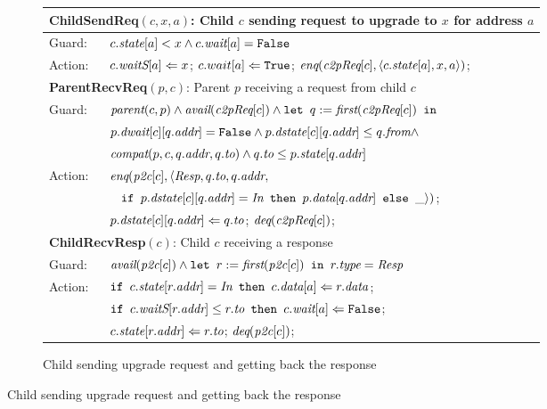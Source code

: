 \begin{figure}
\small
\centering
\begin{subfigure}{\textwidth}
\centering
\begin{tabular}{|ll|}
\hline
\multicolumn{2}{|l|}{\textbf{ChildSendReq}$(c, x, a)$: Child $c$ sending request to upgrade to $x$ for address $a$}\\
\hline
Guard: & $c.\textit{state}[a] < x \wedge c.\textit{wait}[a] = \texttt{False}$\\
\hline
Action: & $c.\textit{waitS}[a] \Leftarrow x$; $c.wait[a] \Leftarrow \texttt{True}$; $\textit{enq}(\textit{c2pReq}[c], \langle c.\textit{state}[a], x, a \rangle)$;\\
\hline
\hline
\multicolumn{2}{|l|}{\textbf{ParentRecvReq}$(p, c)$: Parent $p$ receiving a request from child $c$}\\
\hline
Guard: & 
$\textit{parent}(c,p) \wedge \textit{avail}(\textit{c2pReq}[c]) \wedge \texttt{let } q := \textit{first}(\textit{c2pReq}[c]) \texttt{ in }$\\
& $p.\textit{dwait}[c][q.\textit{addr}] = \texttt{False} \wedge p.\textit{dstate}[c][q.\textit{addr}] \le q.\textit{from} \wedge$\\
& $\textit{compat}(p, c, q.\textit{addr}, q.\textit{to}) \wedge q.\textit{to} \le p.\textit{state}[q.\textit{addr}]$\\
\hline
Action: & $\textit{enq}(\textit{p2c}[c], \langle \textit{Resp}, q.\textit{to}, q.\textit{addr}, $\\
& $\;\;\;%
\myif p.\dstate[c][q.\addr] = \In \mythen p.\data[q.\addr] \myelse \_\rangle)$;\\
& $p.\textit{dstate}[c][q.\textit{addr}] \Leftarrow q.\textit{to}$; $\textit{deq}(\textit{c2pReq}[c])$;\\
\hline
\hline
\multicolumn{2}{|l|}{\textbf{ChildRecvResp}$(c)$: Child $c$ receiving a response}\\
\hline
Guard: & 
$\textit{avail}(\textit{p2c}[c]) \wedge \texttt{let } r := \textit{first}(\textit{p2c}[c]) \texttt{ in } r.\textit{type} = \textit{Resp}$\\
\hline
Action: & $\texttt{if } c.\textit{state}[r.\textit{addr}] = \textit{In} \texttt{ then } c.\textit{data}[a] \Leftarrow r.\textit{data}$;\\
&$\texttt{if } c.\textit{waitS}[r.\textit{addr}] \le r.\textit{to} \texttt{ then } c.\textit{wait}[a] \Leftarrow \texttt{False} $;\\
& $c.\textit{state}[r.\textit{addr}] \Leftarrow r.\textit{to}$; $\textit{deq}(\textit{p2c}[c])$;\\
\hline
\end{tabular}
\caption{Child sending upgrade request and getting back the response}
\label{childside}
\end{subfigure}


\end{figure}
